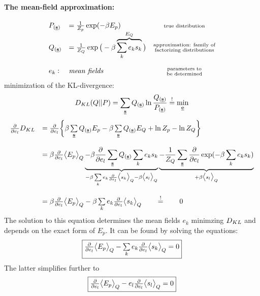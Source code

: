 \paragraph{The mean-field approximation:}
\begin{equation}
	\begin{array}{llc}
	P_{(\vec{s})} 
	& = \frac{1}{Z_p} \exp(-\beta E_p) 
	& \substack{ \text{true distribution} } \\
	Q_{(\vec{s})} 
	& = \frac{1}{Z_Q} \exp\big(-\beta \overbrace{\sum\limits_k e_k s_k}^{E_Q} \big)
	& \substack{ \text{approximation: family of} \\ \text{factorizing distributions} } \\\\
	e_k:
	& \text{\textit{mean fields} }
	& \substack{ \text{parameters to} \\ \text{be determined} }
	\end{array}
\end{equation}
minimization of the KL-divergence:
\begin{equation}
	\dkl(Q||P) = \sum\limits_{\vec{s}} Q_{(\vec{s})} \ln \frac{Q_{(\vec{s})}}{
		P_{(\vec{s})}} \eqexcl \min_{\vec{e}}
\end{equation}
\begin{equation}
	\begin{array}{ll}
	\frac{\partial}{\partial e_l}\dkl
	& = \frac{\partial}{\partial e_l} \bigg\{ \beta \sum\limits_{\vec{s}}
		Q_{(\vec{s})} E_p - \beta \sum\limits_{\vec{s}} 
		Q_{(\vec{s})} E_Q + \ln Z_p - \ln Z_Q \bigg\} \\\\
	& = \beta \frac{\partial}{\partial e_l}\big< E_p \big>_Q
		\underbrace{ -\beta \frac{\partial}{\partial e_l} 
			\sum\limits_{\vec{s}} Q_{(\vec{s})} \sum\limits_k
			e_k s_k }_{ -\beta \sum\limits_k e_k
                        \frac{\partial}{\partial e_l}\big< s_k \big>_Q - \beta
			\big< s_l \big>_Q }
		\underbrace{ -\frac{1}{Z_Q} \sum\limits_{\vec{s}} 
			\frac{\partial}{\partial e_l} \exp(-\beta
			\sum\limits_k e_k s_k) }_{ +\beta \big<s_l\big>_Q }
			\\\\
	& = \beta \frac{\partial}{\partial e_l}\big< E_p \big>_Q -\beta \sum\limits_k 
                        e_k \frac{\partial}{\partial e_l}\big< s_k \big>_Q 
 \qquad \eqexcl \qquad 0
	\end{array}
\end{equation}
The solution to this equation determines the mean fields $e_k$
minimzing $\dkl$ and depends on the exact form of $E_p$. It can be
found by solving the equations:
\begin{equation}\label{eq:MeanfieldEquation}
	\fbox{$ \frac{\partial}{\partial e_l}\big<E_p\big>_Q 
		- \sum\limits_k e_k \frac{\partial}{\partial e_l} \big<s_k\big>_Q = 0
	$}
\end{equation}
The latter simplifies further to 
\begin{equation} \label{eq:mfa_meanfields_simplified}
\fbox{$ \frac{\partial}{\partial e_l}\big<E_p\big>_Q 
		- e_l \frac{\partial}{\partial e_l} \big<s_l\big>_Q = 0
	$}
\end{equation}

